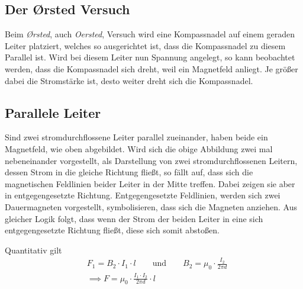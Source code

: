\documentclass{article}
\begin{document}
\subsection{Der Ørsted Versuch}
Beim \emph{Ørsted}, auch \emph{Oersted}, Versuch wird eine Kompassnadel auf einem geraden Leiter platziert, welches so ausgerichtet ist, dass die Kompassnadel zu diesem Parallel ist. Wird bei diesem Leiter nun Spannung angelegt, so kann beobachtet werden, dass die Kompassnadel sich dreht, weil ein Magnetfeld anliegt. Je größer dabei die Stromstärke ist, desto weiter dreht sich die Kompassnadel.
 
\subsection{Parallele Leiter}
Sind zwei stromdurchflossene Leiter parallel zueinander, haben beide ein Magnetfeld, wie oben abgebildet. Wird sich die obige Abbildung zwei mal nebeneinander vorgestellt, als Darstellung von zwei stromdurchflossenen Leitern, dessen Strom in die gleiche Richtung fließt, so fällt auf, dass sich die magnetischen Feldlinien beider Leiter in der Mitte treffen. Dabei zeigen sie aber in entgegengesetzte Richtung. Entgegengesetzte Feldlinien, werden sich zwei Dauermagneten vorgestellt, symbolisieren, dass sich die Magneten anziehen. Aus gleicher Logik folgt, dass wenn der Strom der beiden Leiter in eine sich entgegengesetzte Richtung fließt, diese sich somit abstoßen.
 
Quantitativ gilt
\begin{align*}
 &\hyperref[Magnetische Flussdichten]{
  F_1 = B_2 \cdot I_1 \cdot l
  \qquad \text{und} \qquad
  B_2 = \mu_0 \cdot \frac{I_2}{2 \pi d}
 } \\
 &\implies F = \mu_0 \cdot \frac{I_1 \cdot I_2}{2 \pi d} \cdot l
\end{align*}  
\end{document}
